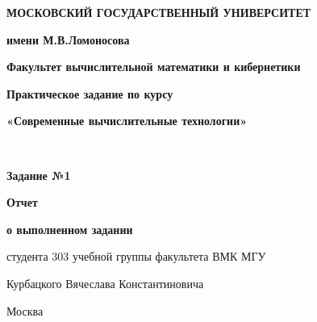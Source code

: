 \documentclass[a4paper,12pt,titlepage,final]{article}
\begin{document}
\begin{titlepage}
\centering\noindent
{
\begin{minipage}{0.1\textwidth}

\end{minipage}
\hfill
\begin{minipage}{0.77\textwidth}
\begin{center}
\textbf{МОСКОВСКИЙ ГОСУДАРСТВЕННЫЙ УНИВЕРСИТЕТ}\par
\textbf{имени М.В.Ломоносова}\par
\end{center}
\end{minipage}
\hfill
\begin{minipage}{0.1\textwidth}

\end{minipage}
}\par
{
\textbf{Факультет вычислительной математики и кибернетики}\par
\nointerlineskip
\noindent\makebox[\linewidth]{\rule{\textwidth}{0.4pt}}
}
\vfill
{
\Large{\textbf{Практическое задание по курсу}}\par
\Large{\textbf{«Современные вычислительные технологии»}}\par
}\\
{
\Large{\textbf{Задание №1}}\par
}
{
\Large{\textbf{Отчет}}\par
\Large{\textbf{о выполненном задании}}\par
\Large{студента 303 учебной группы факультета ВМК МГУ}\par
\Large{Курбацкого Вячеслава Константиновича}\par
}
\vfill
{\small Москва\\ \the\year{}}
\end{titlepage}
\end{document}

